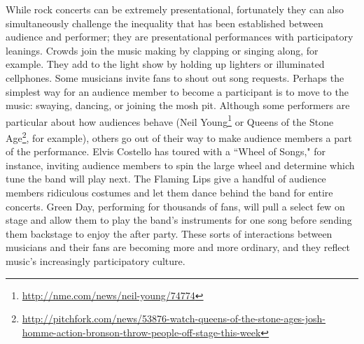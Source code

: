 While rock concerts can be extremely presentational, fortunately they can also simultaneously challenge the inequality that has been established between audience and performer; they are presentational performances with participatory leanings. Crowds join the music making by clapping or singing along, for example. They add to the light show by holding up lighters or illuminated cellphones. Some musicians invite fans to shout out song requests. Perhaps the simplest way for an audience member to become a participant is to move to the music: swaying, dancing, or joining the mosh pit. Although some performers are particular about how audiences behave (Neil Young\footnote{\url{http://nme.com/news/neil-young/74774}} or Queens of the Stone Age\footnote{\url{http://pitchfork.com/news/53876-watch-queens-of-the-stone-ages-josh-homme-action-bronson-throw-people-off-stage-this-week}}, for example), others go out of their way to make audience members a part of the performance. Elvis Costello has toured with a ``Wheel of Songs," for instance, inviting audience members to spin the large wheel and determine which tune the band will play next. The Flaming Lips give a handful of audience members ridiculous costumes and let them dance behind the band for entire concerts. Green Day, performing for thousands of fans, will pull a select few on stage and allow them to play the band's instruments for one song before sending them backstage to enjoy the after party. These sorts of interactions between musicians and their fans are becoming more and more ordinary, and they reflect music's increasingly participatory culture.

